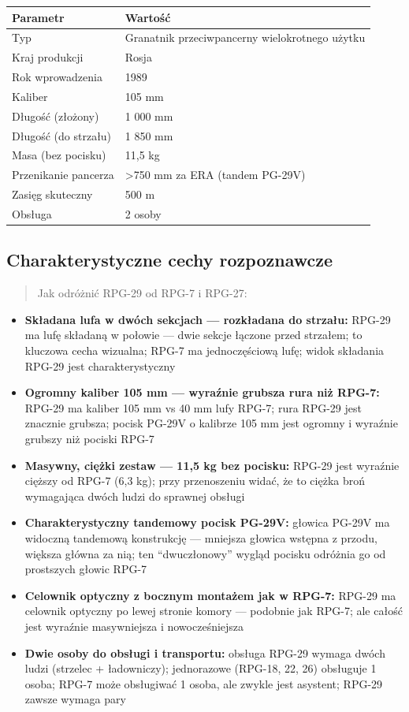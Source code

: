 \documentclass[12pt,oneside]{book}
\providecommand{\tightlist}{%
  \setlength{\itemsep}{0pt}\setlength{\parskip}{0pt}}
\begin{document}
\begin{longtable}[]{@{}ll@{}}
\toprule\noalign{}
Parametr & Wartość \\
\midrule\noalign{}
\endhead
\bottomrule\noalign{}
\endlastfoot
Typ & Granatnik przeciwpancerny wielokrotnego użytku \\
Kraj produkcji & Rosja \\
Rok wprowadzenia & 1989 \\
Kaliber & 105 mm \\
Długość (złożony) & 1 000 mm \\
Długość (do strzału) & 1 850 mm \\
Masa (bez pocisku) & 11,5 kg \\
Przenikanie pancerza & \textgreater750 mm za ERA (tandem PG-29V) \\
Zasięg skuteczny & 500 m \\
Obsługa & 2 osoby \\
\end{longtable}

\subsection{Charakterystyczne cechy
rozpoznawcze}\label{charakterystyczne-cechy-rozpoznawcze-88}

\begin{quote}
Jak odróżnić RPG-29 od RPG-7 i RPG-27:
\end{quote}

\begin{itemize}
\tightlist
\item
  \textbf{Składana lufa w dwóch sekcjach --- rozkładana do strzału:}
  RPG-29 ma lufę składaną w połowie --- dwie sekcje łączone przed
  strzałem; to kluczowa cecha wizualna; RPG-7 ma jednoczęściową lufę;
  widok składania RPG-29 jest charakterystyczny
\item
  \textbf{Ogromny kaliber 105 mm --- wyraźnie grubsza rura niż RPG-7:}
  RPG-29 ma kaliber 105 mm vs 40 mm lufy RPG-7; rura RPG-29 jest
  znacznie grubsza; pocisk PG-29V o kalibrze 105 mm jest ogromny i
  wyraźnie grubszy niż pociski RPG-7
\item
  \textbf{Masywny, ciężki zestaw --- 11,5 kg bez pocisku:} RPG-29 jest
  wyraźnie cięższy od RPG-7 (6,3 kg); przy przenoszeniu widać, że to
  ciężka broń wymagająca dwóch ludzi do sprawnej obsługi
\item
  \textbf{Charakterystyczny tandemowy pocisk PG-29V:} głowica PG-29V ma
  widoczną tandemową konstrukcję --- mniejsza głowica wstępna z przodu,
  większa główna za nią; ten ``dwuczłonowy'' wygląd pocisku odróżnia go
  od prostszych głowic RPG-7
\item
  \textbf{Celownik optyczny z bocznym montażem jak w RPG-7:} RPG-29 ma
  celownik optyczny po lewej stronie komory --- podobnie jak RPG-7; ale
  całość jest wyraźnie masywniejsza i nowocześniejsza
\item
  \textbf{Dwie osoby do obsługi i transportu:} obsługa RPG-29 wymaga
  dwóch ludzi (strzelec + ładowniczy); jednorazowe (RPG-18, 22, 26)
  obsługuje 1 osoba; RPG-7 może obsługiwać 1 osoba, ale zwykle jest
  asystent; RPG-29 zawsze wymaga pary
\end{itemize}
\end{document}
